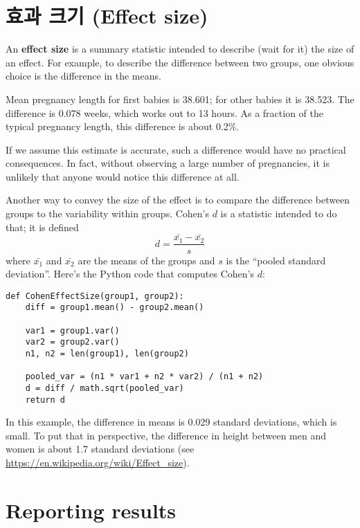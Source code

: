 \section{효과 크기 (Effect size)}



An {\bf effect size} is a summary statistic intended to describe (wait
for it) the size of an effect.  For example, to describe the
difference between two groups, one obvious choice is the difference in
the means.  

Mean pregnancy length for first babies is 38.601; for
other babies it is 38.523.  The difference is 0.078 weeks, which works
out to 13 hours.  As a fraction of the typical pregnancy length, this
difference is about 0.2\%.

If we assume this estimate is accurate, such a difference
would have no practical consequences.  In fact, without
observing a large number of pregnancies, it is unlikely that anyone
would notice this difference at all.

Another way to convey the size of the effect is to compare the
difference between groups to the variability within groups.
Cohen's $d$ is a statistic intended to do that; it is defined
%
\[ d = \frac{\bar{x_1} - \bar{x_2}}{s}  \]
%
where $\bar{x_1}$ and $\bar{x_2}$ are the means of the groups and
$s$ is the ``pooled standard deviation''.  Here's the Python
code that computes Cohen's $d$:

\begin{verbatim}
def CohenEffectSize(group1, group2):
    diff = group1.mean() - group2.mean()

    var1 = group1.var()
    var2 = group2.var()
    n1, n2 = len(group1), len(group2)

    pooled_var = (n1 * var1 + n2 * var2) / (n1 + n2)
    d = diff / math.sqrt(pooled_var)
    return d
\end{verbatim}

In this example, the difference in means is 0.029 standard deviations,
which is small.  To put that in perspective, the difference in
height between men and women is about 1.7 standard deviations (see
\url{https://en.wikipedia.org/wiki/Effect_size}).


\section{Reporting results}

